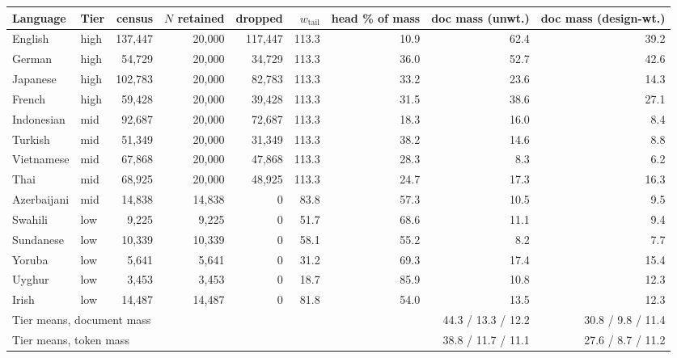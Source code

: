 \documentclass[11pt]{article}
\begin{document}
\begin{minipage}{\textwidth}
\centering
\footnotesize
\setlength{\tabcolsep}{4pt}
\begin{tabular}{llrrrrrrr}
\toprule
Language & Tier & census & $N$ retained & dropped & $w_{\text{tail}}$ & head \% of mass & doc mass (unwt.) & doc mass (design-wt.) \\
\midrule
English & high & 137,447 & 20,000 & 117,447 & 113.3 & 10.9 & 62.4 & 39.2 \\
German & high & 54,729 & 20,000 & 34,729 & 113.3 & 36.0 & 52.7 & 42.6 \\
Japanese & high & 102,783 & 20,000 & 82,783 & 113.3 & 33.2 & 23.6 & 14.3 \\
French & high & 59,428 & 20,000 & 39,428 & 113.3 & 31.5 & 38.6 & 27.1 \\
Indonesian & mid & 92,687 & 20,000 & 72,687 & 113.3 & 18.3 & 16.0 & 8.4 \\
Turkish & mid & 51,349 & 20,000 & 31,349 & 113.3 & 38.2 & 14.6 & 8.8 \\
Vietnamese & mid & 67,868 & 20,000 & 47,868 & 113.3 & 28.3 & 8.3 & 6.2 \\
Thai & mid & 68,925 & 20,000 & 48,925 & 113.3 & 24.7 & 17.3 & 16.3 \\
Azerbaijani & mid & 14,838 & 14,838 & 0 & 83.8 & 57.3 & 10.5 & 9.5 \\
Swahili & low & 9,225 & 9,225 & 0 & 51.7 & 68.6 & 11.1 & 9.4 \\
Sundanese & low & 10,339 & 10,339 & 0 & 58.1 & 55.2 & 8.2 & 7.7 \\
Yoruba & low & 5,641 & 5,641 & 0 & 31.2 & 69.3 & 17.4 & 15.4 \\
Uyghur & low & 3,453 & 3,453 & 0 & 18.7 & 85.9 & 10.8 & 12.3 \\
Irish & low & 14,487 & 14,487 & 0 & 81.8 & 54.0 & 13.5 & 12.3 \\
\midrule
\multicolumn{7}{l}{Tier means, document mass} & 44.3 / 13.3 / 12.2 & 30.8 / 9.8 / 11.4 \\
\multicolumn{7}{l}{Tier means, token mass} & 38.8 / 11.7 / 11.1 & 27.6 / 8.7 / 11.2 \\
\bottomrule
\end{tabular}
\label{tab:app-mass}
\end{minipage}
\end{document}
